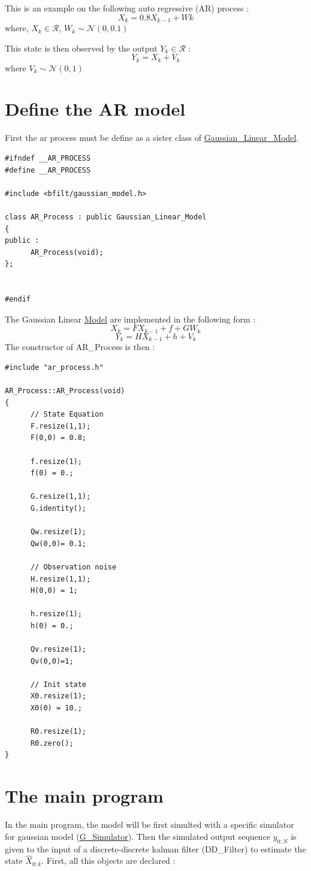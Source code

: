 This is an example on the following auto regressive (AR) process : \[ X_k = 0.8 X_{k-1} + Wk \] where, $ X_{k} \in \mathcal{R} $, $ W_k \sim \mathcal{N}(0,0.1) $ \begin{Desc}
\item[]\end{Desc}
This state is then observed by the output $ Y_k \in \mathcal{R} $ : \[ Y_k = X_k + V_k \] where $ V_k \sim \mathcal{N}(0,1) $\hypertarget{page1_sec1}{}\section{Define the AR model}\label{page1_sec1}
First the ar process must be define as a sister class of \hyperlink{class_gaussian___linear___model}{Gaussian\_\-Linear\_\-Model}. 

\begin{DocInclude}\begin{verbatim}#ifndef __AR_PROCESS
#define __AR_PROCESS

#include <bfilt/gaussian_model.h>

class AR_Process : public Gaussian_Linear_Model
{
public :
      AR_Process(void);
};


#endif
\end{verbatim}
\end{DocInclude}
 The Gaussian Linear \hyperlink{class_model}{Model} are implemented in the following form : \[ X_k = F X_{k-1} + f + G W_k \] \[ Y_k = H X_{k-1} + h + V_k \] The constructor of AR\_\-Process is then : 

\begin{DocInclude}\begin{verbatim}#include "ar_process.h"

AR_Process::AR_Process(void)
{
      // State Equation
      F.resize(1,1);
      F(0,0) = 0.8;

      f.resize(1);
      f(0) = 0.;
      
      G.resize(1,1);
      G.identity();
      
      Qw.resize(1);
      Qw(0,0)= 0.1;

      // Observation noise
      H.resize(1,1);
      H(0,0) = 1;

      h.resize(1);
      h(0) = 0.;

      Qv.resize(1);
      Qv(0,0)=1;
  
      // Init state 
      X0.resize(1);
      X0(0) = 10.;

      R0.resize(1);
      R0.zero();
}
\end{verbatim}
\end{DocInclude}
\hypertarget{page2_sec2}{}\section{The main program}\label{page2_sec2}
In the main program, the model will be first simulted with a specific simulator for gaussian model (\hyperlink{class_g___simulator}{G\_\-Simulator}). Then the simulated output sequence $ y_{0:N}$ is given to the input of a discrete-discrete kalman filter (DD\_\-Filter) to estimate the state $ \hat{X}_{0:k} $. First, all this objects are declared :

